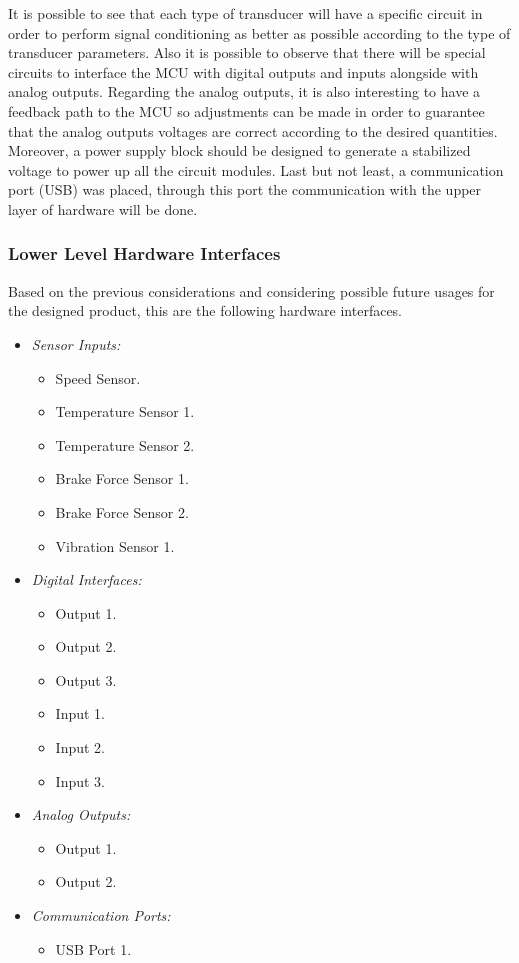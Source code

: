 		It is possible to see that each type of transducer will have a specific circuit in order to perform signal conditioning as better as possible according to the type of transducer parameters. Also it is possible to observe that there will be special circuits to interface the MCU with digital outputs and inputs alongside with analog outputs. Regarding the analog outputs, it is also interesting to have a feedback path to the MCU so adjustments can be made in order to guarantee that the analog outputs voltages are correct according to the desired quantities. Moreover, a power supply block should be designed to generate a stabilized voltage to power up all the circuit modules. Last but not least, a communication port (USB) was placed, through this port the communication with the upper layer of hardware will be done.

		\subsubsection{Lower Level Hardware Interfaces}\label{sssec:lower-level-hardware-interfaces}

			Based on the previous considerations and considering possible future usages for the designed product, this are the following hardware interfaces.

			\begin{itemize}
				\item \textit{Sensor Inputs:}
					\begin{itemize}
						\item Speed Sensor.
						\item Temperature Sensor 1.
						\item Temperature Sensor 2.
						\item Brake Force Sensor 1.
						\item Brake Force Sensor 2.
						\item Vibration Sensor 1.
					\end{itemize}
				\item \textit{Digital Interfaces:}
					\begin{itemize}
						\item Output 1.
						\item Output 2.
						\item Output 3.
						\item Input 1.
						\item Input 2.
						\item Input 3.
					\end{itemize}
				\item \textit{Analog Outputs:}
					\begin{itemize}
						\item Output 1.
						\item Output 2.
					\end{itemize}
				\item \textit{Communication Ports:}
					\begin{itemize}
						\item USB Port 1.
					\end{itemize}
			\end{itemize}